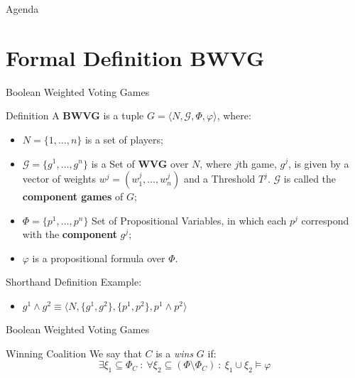 \documentclass{beamer}
\begin{document}
\begin{frame}[fragile]{Agenda}
  \section{Formal Definition BWVG}
  \tableofcontents[currentsection]
\end{frame}

\begin{frame}[fragile]{Boolean Weighted Voting Games}
  \begin{block}{Definition}
    A \textbf{BWVG} is a tuple $G = \langle N, \mathcal{G}, \Phi, \varphi \rangle$, where:
    \begin{itemize}
      \item $N = \{1,\dots,n\}$ is a set of players;
      \item $\mathcal{G} = \{g^1, \dots, g^n\}$ is a Set of \textbf{WVG} over $N$, where $j$th game, $g^j$, is
      given by a vector of weights $w^j = (w_1^j, \dots, w_n^j)$ and a Threshold $T^j$. $\mathcal{G}$ is called the \textbf{component games} of $G$;
      \item $\Phi = \{p^1, \dots, p^n\}$ Set of Propositional Variables, in which each $p^j$ correspond with the \textbf{component} $g^j$;
      \item $\varphi$ is a propositional formula over $\Phi$. 
    \end{itemize}
  \end{block}
  \begin{block}{Shorthand Definition}
    Example:
    \begin{itemize}
      \item $g^1 \land g^2 \equiv \langle N, \{g^1,g^2\}, \{p^1, p^2\}, p^1 \land p^2 \rangle$
    \end{itemize}
  \end{block}
\end{frame}

\begin{frame}[fragile]{Boolean Weighted Voting Games}
  \begin{block}{Winning Coalition}
    We say that $C$ is a \textit{wins} $G$ if:
    \begin{equation}
      \exists \xi_1 \subseteq \Phi_C\ :\ \forall \xi_2 \subseteq (\Phi \setminus \Phi_C)\ :\ \xi_1 \cup \xi_2 \models \varphi \label{eq:1}
    \end{equation}
  \end{block}
\end{frame}
\end{document}

